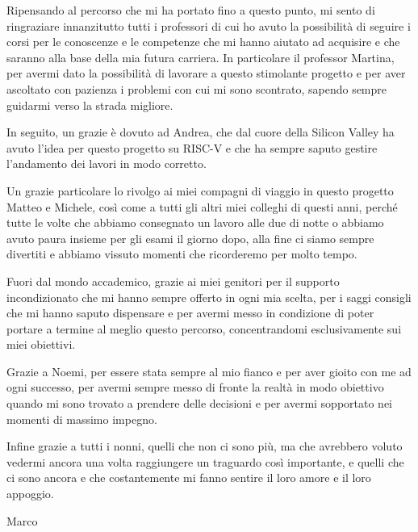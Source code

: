 \documentclass[%
  corpo=12pt,
  tipotesi=magistrale,
  evenboxes,
  twoside,
  cucitura=7mm,
  english
]{toptesi}
\newcommand{\riscv}{RISC-V\xspace}
\begin{document}
\shipout\null
{}

\italiano
\ringraziamenti
Ripensando al percorso che mi ha portato fino a questo punto, mi sento di ringraziare innanzitutto tutti i professori di cui ho avuto la possibilità di seguire i corsi per le conoscenze e le competenze che mi hanno aiutato ad acquisire e che saranno alla base della mia futura carriera. In particolare il professor Martina, per avermi dato la possibilità di lavorare a questo stimolante progetto e per aver ascoltato con pazienza i problemi con cui mi sono scontrato, sapendo sempre guidarmi verso la strada migliore.

In seguito, un grazie è dovuto ad Andrea, che dal cuore della Silicon Valley ha avuto l'idea per questo progetto su \riscv e che ha sempre saputo gestire l'andamento dei lavori in modo corretto.

Un grazie particolare lo rivolgo ai miei compagni di viaggio in questo progetto Matteo e Michele, così come a tutti gli altri miei colleghi di questi anni, perché tutte le volte che abbiamo consegnato un lavoro alle due di notte o abbiamo avuto paura insieme per gli esami il giorno dopo, alla fine ci siamo sempre divertiti e abbiamo vissuto momenti che ricorderemo per molto tempo.

Fuori dal mondo accademico, grazie ai miei genitori per il supporto incondizionato che mi hanno sempre offerto in ogni mia scelta, per i saggi consigli che mi hanno saputo dispensare e per avermi messo in condizione di poter portare a termine al meglio questo percorso, concentrandomi esclusivamente sui miei obiettivi.

Grazie a Noemi, per essere stata sempre al mio fianco e per aver gioito con me ad ogni successo, per avermi sempre messo di fronte la realtà in modo obiettivo quando mi sono trovato a prendere delle decisioni e per avermi sopportato nei momenti di massimo impegno.

Infine grazie a tutti i nonni, quelli che non ci sono più, ma che avrebbero voluto vedermi ancora una volta raggiungere un traguardo così importante, e quelli che ci sono ancora e che costantemente mi fanno sentire il loro amore e il loro appoggio.
\vspace{1.5cm}
\begin{flushright}
  Marco
\end{flushright}

\newpage
\thispagestyle{empty} %
\mbox{}

\english

\figurespagetrue
\tablespagetrue
\indici










\end{document}

